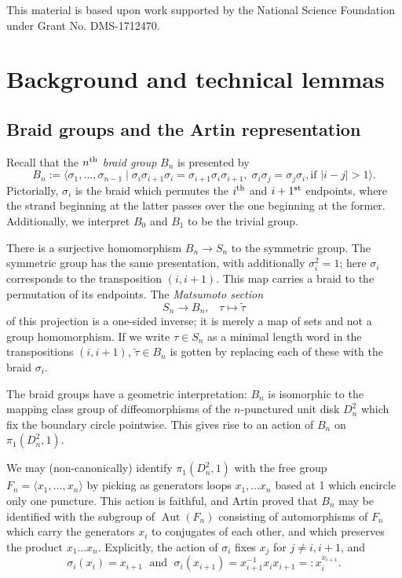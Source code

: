 \documentclass[12pt]{article}
\DeclareMathOperator{\Aut}{Aut}
\newcommand{\tautilde}{\widetilde{\tau}}
\newcommand{\nth}{\textsuperscript{th}}
\newcommand{\st}{\textsuperscript{st}}
\theoremstyle{plain}
\theoremstyle{definition}
\theoremstyle{remark}
\begin{document}
This material is based upon work supported by the National Science Foundation under Grant No. DMS-1712470. 

\section{Background and technical lemmas}

\subsection{Braid groups and the Artin representation} \label{Bn_section}

Recall that the \emph{$n\nth$ braid group} $B_n$ is presented by
%
\[ B_n := \langle \sigma_1, \dots, \sigma_{n-1} \; | \; \sigma_i \sigma_{i+1} \sigma_i =  \sigma_{i+1} \sigma_i \sigma_{i+1}, \; \sigma_i \sigma_j =\sigma_j \sigma_i, \mbox{if $|i-j|>1$} \rangle. \]
%
Pictorially, $\sigma_i$ is the braid which permutes the $i\nth$ and $i+1\st$ endpoints, where the strand beginning at the latter passes over the one beginning at the former.  Additionally, we interpret $B_0$ and $B_1$ to be the trivial group.  

There is a surjective homomorphism $B_n \to S_n$ to the symmetric group.  The symmetric group has the same presentation, with additionally $\sigma_i^2=1$; here $\sigma_i$ corresponds to the transposition $(i,i+1)$.  This map carries a braid to the permutation of its endpoints.  The \emph{Matsumoto section} 
%
$$S_n \to B_n, \; \; \; \tau \mapsto \tautilde$$
%
of this projection is a one-sided inverse; it is merely a map of sets and not a group homomorphism.  If we write $\tau \in S_n$ as a minimal length word in the transpositions $(i, i+1)$, $\tautilde \in B_{n}$ is gotten by replacing each of these with the braid $\sigma_i$.

The braid groups have a geometric interpretation: $B_n$ is isomorphic to the mapping class group of diffeomorphisms of the $n$-punctured unit disk $D^2_n$ which fix the boundary circle pointwise.  This gives rise to an action of $B_n$ on $\pi_1(D^2_n, 1)$.  

We may (non-canonically) identify $\pi_1(D^2_n, 1)$ with the free group $F_n = \langle x_1, \dots, x_n \rangle$ by picking as generators loops $x_1, \dots x_n$ based at 1 which encircle only one puncture.  This action is faithful, and Artin \cite{artin} proved that $B_n$ may be identified with the subgroup of $\Aut(F_n)$ consisting of automorphisms of $F_n$ which carry the generators $x_i$ to conjugates of each other, and which preserves the product $x_1 \dots x_n$.  Explicitly, the action of $\sigma_i$ fixes $x_j$ for $j \neq i, i+1$, and 
%
$$\sigma_i(x_i) = x_{i+1} \; \mbox{ and } \; \sigma_i(x_{i+1}) = x_{i+1}^{-1} x_i x_{i+1} =: x_i^{x_{i+1}}.$$
\end{document}
